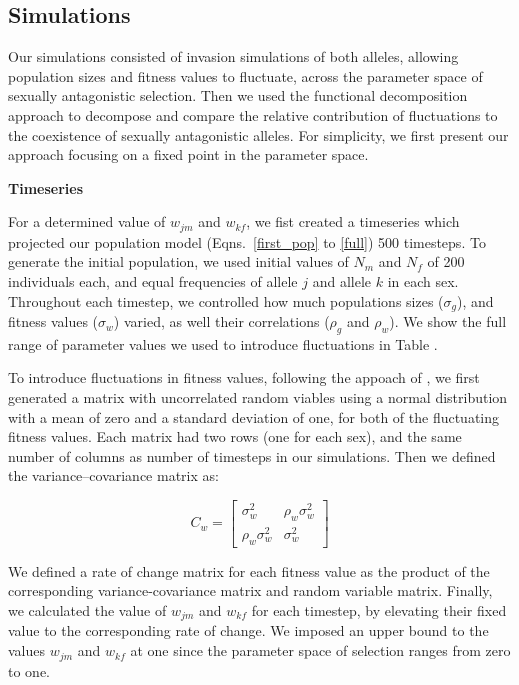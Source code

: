 \documentclass[]{article}
\begin{document}
\subsection*{Simulations}

Our simulations consisted of invasion simulations of both alleles, allowing population sizes and fitness values to fluctuate, across the parameter space of sexually antagonistic selection. Then we used the functional decomposition approach to decompose and compare the relative contribution of fluctuations to the coexistence of sexually antagonistic alleles. For simplicity, we first present our approach focusing on a fixed point in the parameter space.

\vspace{5mm}
\noindent\textbf{Timeseries}

For a determined value of $w_{jm}$ and $w_{kf}$, we fist created a timeseries which projected our population model (Eqns.~\ref{first_pop} to \ref{full}) 500 timesteps. To generate the initial population, we used initial values of $N_{m}$ and $N_{f}$  of 200 individuals each, and equal frequencies of allele $j$ and allele $k$ in each sex. Throughout each timestep, we controlled how much populations sizes ($\sigma_{g}$), and fitness values ($\sigma_{w}$) varied, as well their correlations ($\rho_{g}$ and $\rho_{w}$). We show the full range of parameter values we used to introduce fluctuations in Table .

To introduce fluctuations in fitness values, following the appoach of  \citet{shoemaker2020}, we first generated a matrix with uncorrelated random viables using a normal distribution with a mean of zero and a standard deviation of one, for both of the fluctuating fitness values. Each matrix had two rows (one for each sex), and the same number of columns as number of timesteps in our simulations. Then we defined the variance--covariance matrix as:


\begin{equation}
C_{w} = \begin{bmatrix}
\sigma_{w}^{2} & \rho_{w} \sigma_{w}^{2} \\
\rho_{w} \sigma_{w}^{2} & \sigma_{w}^{2}
\end{bmatrix}
\end{equation}

We defined a rate of change matrix for each fitness value as the product of the corresponding variance-covariance matrix and random variable matrix. Finally, we calculated the value of $w_{jm}$ and $w_{kf}$ for each timestep, by elevating their fixed value to the corresponding rate of change. We imposed an upper bound to the values $w_{jm}$ and $w_{kf}$ at one since the parameter space of selection ranges from zero to one.
\end{document}
